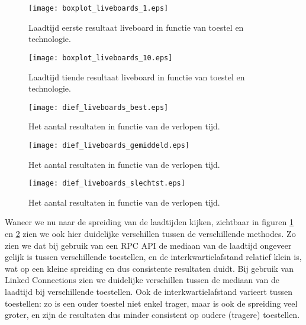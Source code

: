\begin{figure}[h]
	\centering
	\texttt{[image: boxplot\_liveboards\_1.eps]}
	\caption[Laadtijd eerste resultaat liveboard in functie van toestel en technologie]{Laadtijd eerste resultaat liveboard in functie van toestel en technologie.}
	\label{fig:liveboardsBoxplot1}
\end{figure}

\begin{figure}[h]
	\centering
	\texttt{[image: boxplot\_liveboards\_10.eps]}
	\caption[Laadtijd tiende resultaat liveboard in functie van toestel en technologie]{Laadtijd tiende resultaat liveboard in functie van toestel en technologie.}
	\label{fig:liveboardsBoxplot10}
\end{figure}

\begin{figure}[h]
	\centering
	\texttt{[image: dief\_liveboards\_best.eps]}
	\caption[Aantal resultaten liveboards in functie van de tijd]{Het aantal resultaten in functie van de verlopen tijd.}
	\label{fig:liveboardsDiefBest}
\end{figure}

\begin{figure}[h]
	\centering
	\texttt{[image: dief\_liveboards\_gemiddeld.eps]}
	\caption[Aantal resultaten liveboards in functie van de tijd]{Het aantal resultaten in functie van de verlopen tijd.}
	\label{fig:liveboardsDiefAvg}
\end{figure}

\begin{figure}[h]
	\centering
	\texttt{[image: dief\_liveboards\_slechtst.eps]}
	\caption[Aantal resultaten liveboards in functie van de tijd]{Het aantal resultaten in functie van de verlopen tijd.}
	\label{fig:liveboardsDiefSlechtst}
\end{figure}

Waneer we nu naar de spreiding van de laadtijden kijken, zichtbaar in figuren \ref{fig:liveboardsBoxplot1} en \ref{fig:liveboardsBoxplot10} zien we ook hier duidelijke verschillen tussen de verschillende methodes. Zo zien we dat bij gebruik van een RPC API de mediaan van de laadtijd ongeveer gelijk is tussen verschillende toestellen, en de interkwartielafstand relatief klein is, wat op een kleine spreiding en dus consistente resultaten duidt. Bij gebruik van Linked Connections zien we duidelijke verschillen tussen de mediaan van de laadtijd bij verschillende toestellen. Ook de interkwartielafstand varieert tussen toestellen: zo is een ouder toestel niet enkel trager, maar is ook de spreiding veel groter, en zijn de resultaten dus minder consistent op oudere (tragere) toestellen.

